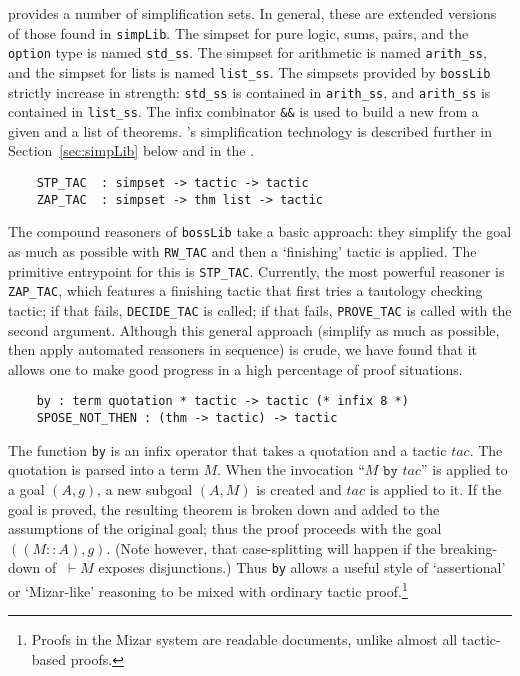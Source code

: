  provides a number of simplification sets. In general,
these are extended versions of those found in \verb+simpLib+. The
simpset for pure logic, sums, pairs, and the \verb+option+ type is
named \verb+std_ss+. The simpset for arithmetic is named
\verb+arith_ss+, and the simpset for lists is named \verb+list_ss+.
The simpsets provided by {\tt bossLib} strictly increase in strength:
{\tt std\_ss} is contained in {\tt arith\_ss}, and {\tt arith\_ss} is
contained in {\tt list\_ss}.  The infix combinator \verb+&&+ is used
to build a new \simpset{} from a given \simpset{} and a list of
theorems. \HOL's simplification technology is described further in
Section~\ref{sec:simpLib} below and in the \REFERENCE.

\begin{verbatim}
    STP_TAC  : simpset -> tactic -> tactic
    ZAP_TAC  : simpset -> thm list -> tactic
\end{verbatim}

The compound reasoners of \verb+bossLib+ take a basic approach: they
simplify the goal as much as possible with \verb+RW_TAC+ and then a
`finishing' tactic is applied. The primitive entrypoint for this is
\texttt{STP\_TAC}. Currently, the most powerful reasoner is
\texttt{ZAP\_TAC}, which features a finishing tactic that first
tries a tautology checking tactic; if that fails, \verb+DECIDE_TAC+ is
called; if that fails, \verb+PROVE_TAC+ is called with the second
argument. Although this general approach (simplify as much as possible,
then apply automated reasoners in sequence) is crude, we have found that
it allows one to make good progress in a high percentage of proof
situations.

\begin{verbatim}
    by : term quotation * tactic -> tactic (* infix 8 *)
    SPOSE_NOT_THEN : (thm -> tactic) -> tactic
\end{verbatim}

The function \texttt{by} is an infix operator that takes a quotation
and a tactic $tac$. The quotation is parsed into a term $M$. When the
invocation ``$M\texttt{ by } \mathit{tac}$'' is applied to a goal
$(A,g)$, a new subgoal $(A,M)$ is created and $tac$ is applied to it.
If the goal is proved, the resulting theorem is broken down and added
to the assumptions of the original goal; thus the proof proceeds with
the goal $((M::A), g)$. (Note however, that case-splitting will happen
if the breaking-down of $\ \vdash M$ exposes disjunctions.) Thus
\texttt{by} allows a useful style of `assertional' or `Mizar-like'
reasoning to be mixed with ordinary tactic proof.\footnote{Proofs in
  the Mizar system are readable documents, unlike almost all
  tactic-based proofs.}


